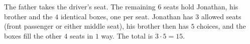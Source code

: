 The father takes the driver's seat. The remaining $6$ seats hold Jonathan, his brother and the $4$ identical boxes, one per seat. Jonathan has $3$ allowed seats (front passenger or either middle seat), his brother then has $5$ choices, and the boxes fill the other $4$ seats in $1$ way. The total is $3\cdot5=\boxed{15}$.

